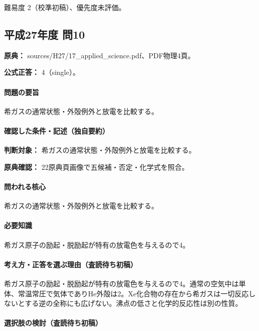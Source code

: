 \par 難易度 2（校準初稿）、優先度未評価。

\subsection{平成27年度 問10}
\label{q:h27-reg-applied-10}

\noindent\textbf{原典：} sources/H27/17\_applied\_science.pdf、PDF物理4頁。

\textbf{公式正答：} 4（single）。

\paragraph{問題の要旨} 希ガスの通常状態・外殻例外と放電を比較する。

\paragraph{確認した条件・記述（独自要約）}\mbox{}\par

\noindent\textbf{判断対象：} 希ガスの通常状態・外殻例外と放電を比較する。\par

\noindent\textbf{原典確認：} 22原典頁画像で五候補・否定・化学式を照合。\par

\paragraph{問われる核心} 希ガスの通常状態・外殻例外と放電を比較する。

\paragraph{必要知識} 希ガス原子の励起・脱励起が特有の放電色を与えるので4。

\paragraph{考え方・正答を選ぶ理由（査読待ち初稿）} 希ガス原子の励起・脱励起が特有の放電色を与えるので4。通常の空気中は単体、常温常圧で気体でありHe外殻は2。Xe化合物の存在から希ガスは一切反応しないとする逆の全称にも広げない。沸点の低さと化学的反応性は別の性質。

\paragraph{選択肢の検討（査読待ち初稿）}\mbox{}\par

